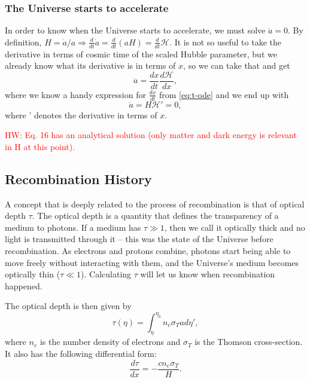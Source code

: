 \documentclass{aa}
\newcommand{\hw}[1]{\textcolor{red}{HW: #1}}
\begin{document}
\subsubsection{The Universe starts to accelerate}

In order to know when the Universe starts to accelerate, we must solve $\ddot a = 0$. By definition, $H = \dot{a}/a \Rightarrow \frac{d}{dt} \dot a = \frac{d}{dt} (aH) = \frac{d}{dt}\mathcal H$. It is not so useful to take the derivative in terms of cosmic time of the scaled Hubble parameter, but we already know what its derivative is in terms of $x$, so we can take that and get
\begin{equation}
    \ddot a = \frac{dx}{dt}\frac{d\mathcal H}{dx},
\end{equation}
where we know a handy expression for $\frac{dx}{dt}$ from \eqref{eq:t-ode} and we end up with
\begin{equation}
    \ddot a = H\mathcal{H'} = 0,
\end{equation}
where ' denotes the derivative in terms of $x$.

\hw{Eq. 16 has an analytical solution (only matter and dark energy is relevant in H at this point).}

\subsection{Recombination History}

A concept that is deeply related to the process of recombination is that of optical depth $\tau$. The optical depth is a quantity that defines the transparency of a medium to photons. If a medium has $\tau\gg1$, then we call it optically thick and no light is transmitted through it -- this was the state of the Universe before recombination. As electrons and protons combine, photons start being able to move freely without interacting with them, and the Universe's medium becomes optically thin ($\tau\ll 1$). Calculating $\tau$ will let us know when recombination happened.

The optical depth is then given by
\begin{equation}
\tau(\eta) = \int_{\eta}^{\eta_0} n_e \sigma_T a d\eta',
\end{equation}
where $n_e$ is the number density of electrons and $\sigma_T$ is the Thomson cross-section. It also has the following differential form:
\begin{equation}
\frac{d\tau}{dx} = -\frac{c n_e \sigma_T}{H}.
\end{equation}
\end{document}
